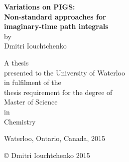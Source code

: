 \documentclass[11pt, twoside, final]{book}
\begin{document}
\frontmatter

\pagestyle{plain}

\begin{titlepage}
\begin{center}

\mbox{}\vfill
\vfill
\vfill
\vfill

{ \LARGE \bfseries
	Variations on PIGS: \\[1 mm]
	Non-standard approaches for \\[1 mm]
	imaginary-time path integrals
} \\[5 mm]

by \\[5 mm]

{ \Large Dmitri Iouchtchenko }

\vfill
\vfill

A thesis \\
presented to the University of Waterloo \\
in fulfilment of the \\
thesis requirement for the degree of \\
Master of Science \\
in \\
Chemistry

\vfill

Waterloo, Ontario, Canada, 2015

\vfill

\copyright{} Dmitri Iouchtchenko 2015

\vfill

\end{center}
\end{titlepage}






\tableofcontents

\renewcommand{\nomname}{List of abbreviations}
\def\nomlabel#1{\hspace{5 mm}\textbf{#1}\hfil}
\printnomenclature[1 in]

\renewcommand{\listfigurename}{List of figures}
\listoffigures

\renewcommand{\listtablename}{List of tables}
\listoftables




\mainmatter

\pagestyle{fancy}







\appendix








\backmatter

\pagestyle{plain}

\newrefcontext[sorting=customsort]
\printbibliography[title={References}, heading=bibnumbered]
\end{document}
